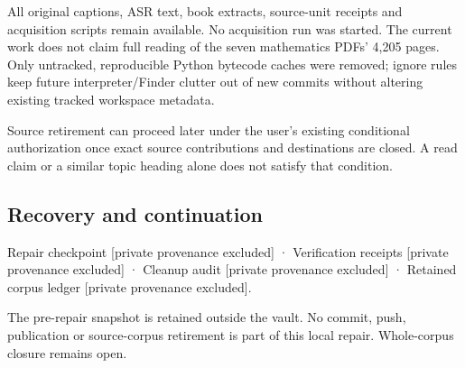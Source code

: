All original captions, ASR text, book extracts, source-unit receipts and acquisition scripts remain available. No acquisition run was started. The current work does not claim full reading of the seven mathematics PDFs' 4,205 pages. Only untracked, reproducible Python bytecode caches were removed; ignore rules keep future interpreter/Finder clutter out of new commits without altering existing tracked workspace metadata.

Source retirement can proceed later under the user's existing conditional authorization once exact source contributions and destinations are closed. A read claim or a similar topic heading alone does not satisfy that condition.

\subsection{Recovery and continuation}\label{appendix-faa2b5a8e820-recovery-and-continuation}

{Repair checkpoint {[}private provenance excluded{]}} · {Verification receipts {[}private provenance excluded{]}} · {Cleanup audit {[}private provenance excluded{]}} · {Retained corpus ledger {[}private provenance excluded{]}}.

The pre-repair snapshot is retained outside the vault. No commit, push, publication or source-corpus retirement is part of this local repair. Whole-corpus closure remains open.

